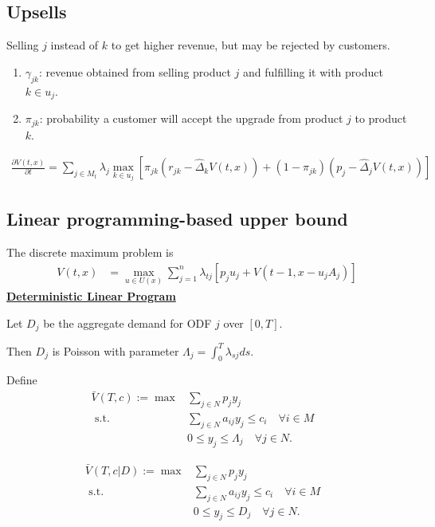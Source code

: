\documentclass[11pt,a4paper]{article}
\begin{document}
\subsection{Upsells}
Selling $j$ instead of $k$ to get higher revenue, but may be rejected by customers.
\begin{enumerate}[$\bullet$]
    \item $\gamma_{jk}$: revenue obtained from selling product $j$ and fulfilling it with product $k\in u_j$.
    \item $\pi_{jk}$: probability a customer will accept the upgrade from product $j$ to product $k$.
\end{enumerate}
\begin{equation}
    \begin{aligned}
        \frac{\partial V(t, x)}{\partial t}=\sum_{j\in M_t} \lambda_{j}\max_{k\in u_j}\left[\pi_{jk}(r_{jk}-\hat{\Delta}_kV(t,x))+(1-\pi_{jk})(p_j-\hat{\Delta}_jV(t,x))\right]
    \end{aligned}
    \nonumber
\end{equation}

\subsection{Linear programming-based upper bound}
The discrete maximum problem is
\begin{equation}
    \begin{aligned}
        V(t,x)&=\max_{u\in U(x)}\sum_{j=1}^n\lambda_{tj}[p_ju_j+V(t-1,x-u_jA_j)]
    \end{aligned}
    \nonumber
\end{equation}
\textbf{\underline{Deterministic Linear Program}}

Let $D_j$ be the aggregate demand for ODF $j$ over $[0,T]$.

Then $D_j$ is Poisson with parameter $\Lambda_j=\int_0^T\lambda_{sj}ds$.

Define
$$\begin{array}{rlr}
    \bar{V}(T, c):=\max & \sum_{j \in N} p_{j} y_{j} & \\
    \text { s.t. } & \sum_{j \in N} a_{i j} y_{j} \leq c_{i} \quad \forall i \in M \\
    & 0 \leq y_{j} \leq \Lambda_{j} \quad \forall j \in N .
\end{array}$$

$$\begin{array}{rlr}
    \bar{V}(T, c|D):=\max & \sum_{j \in N} p_{j} y_{j} & \\
    \text { s.t. } & \sum_{j \in N} a_{i j} y_{j} \leq c_{i} \quad \forall i \in M \\
    & 0 \leq y_{j} \leq D_{j} \quad \forall j \in N .
\end{array}$$
\end{document}

